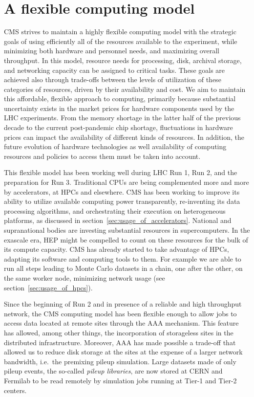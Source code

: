 \documentclass{cmspaper}
\begin{document}
\section{A flexible computing model}
\label{sec:flexible_computing_model}
CMS strives to maintain a highly flexible computing model with the strategic goals of using efficiently all of the resources available to the experiment, while minimizing both hardware and personnel needs, and maximizing overall throughput. In this model, resource needs for processing, disk, archival storage, and networking capacity can be assigned to critical tasks. These goals are achieved also through trade-offs between the levels of utilization of these categories of resources, driven by their availability and cost. We aim to maintain this affordable, flexible approach to computing, primarily because substantial uncertainty exists in the market prices for hardware components used by the LHC experiments. From the memory shortage in the latter half of the previous decade to the current post-pandemic chip shortage, fluctuations in hardware prices can impact the availability of different kinds of resources. In addition, the future evolution of hardware technologies as well availability of computing resources and policies to access them must be taken into account. 

This flexible model has been working well during LHC Run 1, Run 2, and the preparation for Run 3. Traditional CPUs are being complemented more and more by accelerators, at HPCs and elsewhere. CMS has been working to improve its ability to utilize available computing power transparently, re-inventing its data processing algorithms, and orchestrating their execution on heterogeneous platforms, as discussed in section~\ref{sec:usage_of_accelerators}. National and supranational bodies are investing substantial resources in supercomputers. In the exascale era, HEP might be compelled to count on these resources for the bulk of its compute capacity. CMS has already started to take advantage of HPCs, adapting its software and computing tools to them. For example we are able to run all steps leading to Monte Carlo datasets in a chain, one after the other, on the same worker node, minimizing network usage (see section~\ref{sec:usage_of_hpcs}).

Since the beginning of Run 2 and in presence of a reliable and high throughput network, the CMS computing model has been flexible enough to allow jobs to access data located at remote sites through the AAA mechanism. This feature has allowed, among other things, the incorporation of storageless sites in the distributed infrastructure. Moreover, AAA has made possible a trade-off that allowed us to reduce disk storage at the sites at the expense of a larger network bandwidth, i.e.~the premixing pileup simulation. Large datasets made of only pileup events, the so-called \textit{pileup libraries}, are now stored at CERN and Fermilab to be read remotely by simulation jobs running at Tier-1 and Tier-2 centers. 
\end{document}
